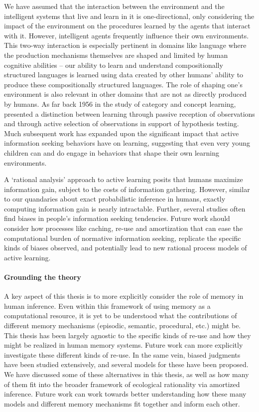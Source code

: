 We have assumed that the interaction between the environment and the intelligent systems that live and learn in it is one-directional, only considering the impact of the environment on the procedures learned by the agents that interact with it. However, intelligent agents frequently influence their own environments. This two-way interaction is especially pertinent in domains like language where the production mechanisms themselves are shaped and limited by human cognitive abilities -- our ability to learn and understand compositionally structured languages is learned using data created by other humans' ability to produce these compositionally structured languages. The role of shaping one's environment is also relevant in other domains that are not as directly produced by humans. As far back 1956 in the study of category and concept learning, \citet{bruner2017study} presented a distinction between learning through passive reception of observations and through active selection of observations in support of hypothesis testing. Much subsequent work has expanded upon the significant impact that active information seeking behaviors have on learning\citep{nelson2005finding,markant2014better, gureckis2012self}, suggesting that even very young children can and do engage in behaviors that shape their own learning environments\citep{ruggeri2017toma, gopnik1996scientist, montessori1912montessori}. 

A `rational analysis' approach to active learning posits that humans maximize information gain, subject to the costs of information gathering. However, similar to our quandaries about exact probabilistic inference in humans, exactly computing information gain is nearly intractable. Further, several studies often find biases in people's information seeking tendencies\citep{jonas2001confirmation, beattie1988confirmation}. Future work should consider how processes like caching, re-use and amortization that can ease the computational burden of normative information seeking, replicate the specific kinds of biases observed, and potentially lead to new rational process models of active learning.

\paragraph{Grounding the theory}

A key aspect of this thesis is to more explicitly consider the role of memory in human inference. Even within this framework of using memory as a computational resource, it is yet to be understood what the contributions of different memory mechanisms (episodic, semantic, procedural, etc.) might be. This thesis has been largely agnostic to the specific kinds of re-use and how they might be realized in human memory systems. Future work can more explicitly investigate these different kinds of re-use. In the same vein, biased judgments have been studied extensively, and several models for these have been proposed. We have discussed some of these alternatives in this thesis, as well as how many of them fit into the broader framework of ecological rationality via amortized inference. Future work can work towards better understanding how these many models and different memory mechanisms fit together and inform each other.

